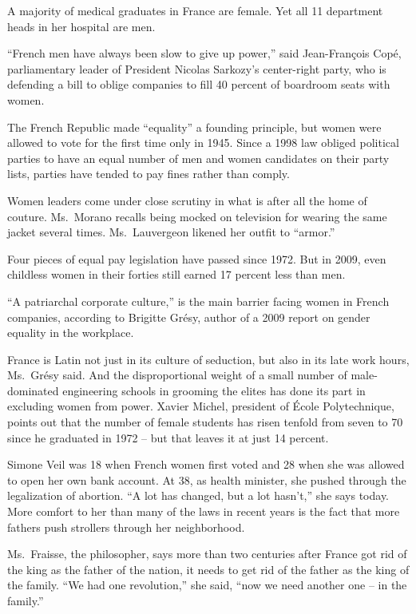 ﻿\documentclass[12pt]{article}
\begin{document}
A majority of medical graduates in France are female. Yet all 11 department heads in her hospital
are men.

``French men have always been slow to give up power,'' said Jean-François Cop\'e, parliamentary
leader of President Nicolas Sarkozy's center-right party, who is defending a bill to oblige
companies to fill 40 percent of boardroom seats with women.

The French Republic made ``equality'' a founding principle, but women were allowed to vote for the
first time only in 1945. Since a 1998 law obliged political parties to have an equal number of men
and women candidates on their party lists, parties have tended to pay fines rather than comply.

Women leaders come under close scrutiny in what is after all the home of couture. Ms.~Morano recalls
being mocked on television for wearing the same jacket several times. Ms.~Lauvergeon likened her
outfit to ``armor.''

Four pieces of equal pay legislation have passed since 1972. But in 2009, even childless women in
their forties still earned 17 percent less than men.

``A patriarchal corporate culture,'' is the main barrier facing women in French companies, according
to Brigitte Gr\'esy, author of a 2009 report on gender equality in the workplace.

France is Latin not just in its culture of seduction, but also in its late work hours, Ms.~Gr\'esy
said. And the disproportional weight of a small number of male-dominated engineering schools in
grooming the elites has done its part in excluding women from power. Xavier Michel, president of
École Polytechnique, points out that the number of female students has risen tenfold from seven to
70 since he graduated in 1972 -- but that leaves it at just 14 percent.

Simone Veil was 18 when French women first voted and 28 when she was allowed to open her own bank
account. At 38, as health minister, she pushed through the legalization of abortion. ``A lot has
changed, but a lot hasn't,'' she says today. More comfort to her than many of the laws in recent
years is the fact that more fathers push strollers through her neighborhood.

Ms.~Fraisse, the philosopher, says more than two centuries after France got rid of the king as the
father of the nation, it needs to get rid of the father as the king of the family. ``We had one
revolution,'' she said, ``now we need another one -- in the family.''
\end{document}
